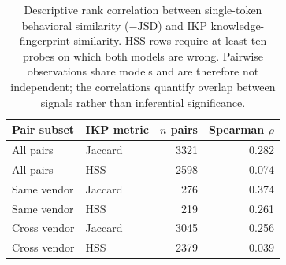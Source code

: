 \begin{table}[H]
    \centering
    \small
    \begin{tabular}{llrr}
        \toprule
        Pair subset & IKP metric & $n$ pairs & Spearman $\rho$ \\
        \midrule
All pairs & Jaccard & 3321 & 0.282 \\
All pairs & HSS & 2598 & 0.074 \\
Same vendor & Jaccard & 276 & 0.374 \\
Same vendor & HSS & 219 & 0.261 \\
Cross vendor & Jaccard & 3045 & 0.256 \\
Cross vendor & HSS & 2379 & 0.039 \\
        \bottomrule
    \end{tabular}
    \caption{Descriptive rank correlation between single-token behavioral similarity ($-\mathrm{JSD}$) and IKP knowledge-fingerprint similarity. HSS rows require at least ten probes on which both models are wrong. Pairwise observations share models and are therefore not independent; the correlations quantify overlap between signals rather than inferential significance.}
    \label{tab:single-token-complementarity}
\end{table}

